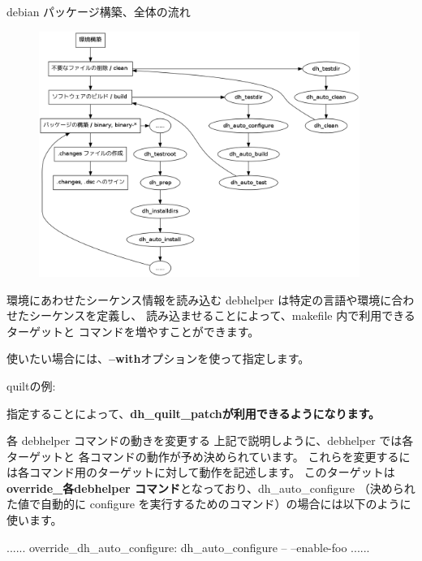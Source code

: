 \begin{frame}{debian パッケージ構築、全体の流れ}

\begin{figure}[ht]
  \begin{center}
    \includegraphics[height=8cm]{image201110/rules-work.png}
  \end{center}
\end{figure}
\end{frame}


\begin{frame}[containsverbatim]{環境にあわせたシーケンス情報を読み込む}
debhelper は特定の言語や環境に合わせたシーケンスを定義し、
読み込ませることによって、makefile 内で利用できるターゲットと
コマンドを増やすことができます。

使いたい場合には、{\bf --with}オプションを使って指定します。

quiltの例:
指定することによって、\bf{dh\_quilt\_patch}が利用できるようになります。
\end{frame}

\begin{frame}[containsverbatim]{各 debhelper コマンドの動きを変更する}
上記で説明しように、debhelper では各ターゲットと
各コマンドの動作が予め決められています。
これらを変更するには各コマンド用のターゲットに対して動作を記述します。
このターゲットは {\bf override\_各debhelper コマンド}となっており、dh\_auto\_configure
（決められた値で自動的に configure を実行するためのコマンド）の場合には以下のように使います。

\begin{commandline}
......
override_dh_auto_configure:
    dh_auto_configure -- --enable-foo
......
\end{commandline}


\end{frame}


